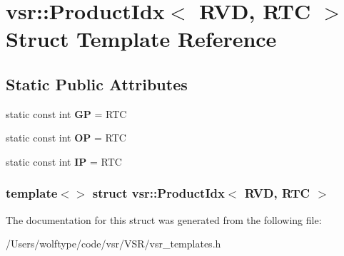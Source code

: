 \hypertarget{structvsr_1_1_product_idx_3_01_r_v_d_00_01_r_t_c_01_4}{\section{vsr\-:\-:Product\-Idx$<$ R\-V\-D, R\-T\-C $>$ Struct Template Reference}
\label{structvsr_1_1_product_idx_3_01_r_v_d_00_01_r_t_c_01_4}
}
\subsection*{Static Public Attributes}
\begin{DoxyCompactItemize}
\item 
\hypertarget{structvsr_1_1_product_idx_3_01_r_v_d_00_01_r_t_c_01_4_a4f20008f294180e043eee2be42884869}{static const int {\bfseries G\-P} = R\-T\-C}\label{structvsr_1_1_product_idx_3_01_r_v_d_00_01_r_t_c_01_4_a4f20008f294180e043eee2be42884869}

\item 
\hypertarget{structvsr_1_1_product_idx_3_01_r_v_d_00_01_r_t_c_01_4_ad4d5265c8c682454bb018bd467c00124}{static const int {\bfseries O\-P} = R\-T\-C}\label{structvsr_1_1_product_idx_3_01_r_v_d_00_01_r_t_c_01_4_ad4d5265c8c682454bb018bd467c00124}

\item 
\hypertarget{structvsr_1_1_product_idx_3_01_r_v_d_00_01_r_t_c_01_4_abf179f22df989935ebcbf13f40c8b00e}{static const int {\bfseries I\-P} = R\-T\-C}\label{structvsr_1_1_product_idx_3_01_r_v_d_00_01_r_t_c_01_4_abf179f22df989935ebcbf13f40c8b00e}

\end{DoxyCompactItemize}
\subsubsection*{template$<$$>$ struct vsr\-::\-Product\-Idx$<$ R\-V\-D, R\-T\-C $>$}



The documentation for this struct was generated from the following file\-:\begin{DoxyCompactItemize}
\item 
/\-Users/wolftype/code/vsr/\-V\-S\-R/vsr\-\_\-templates.\-h\end{DoxyCompactItemize}
